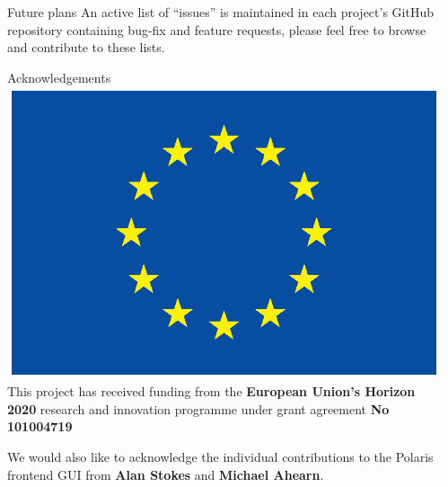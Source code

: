 \documentclass[final]{beamer}
\newlength{\sepwidth}
\newlength{\colwidth}
\newcommand{\separatorcolumn}{\begin{column}{\sepwidth}\end{column}}
\begin{document}
\begin{frame}[t]
\begin{columns}[t]
\begin{column}{\colwidth}
\begin{exampleblock}{Future plans}
                    An active list of ``issues'' is maintained in each project's GitHub repository containing
                    bug-fix and feature requests, please feel free to browse and contribute to these lists.

                \end{exampleblock}

                \begin{block}{Acknowledgements}
                    \includegraphics[height=\baselineskip]{logos/EU_flag_yellow_eps}
                    This project has received funding from the \textbf{European Union’s Horizon 2020} research and
                    innovation programme under grant agreement \textbf{No 101004719}

                    We would also like to acknowledge the individual contributions to the Polaris frontend
                    GUI from \textbf{Alan Stokes} and \textbf{Michael Ahearn}.
                \end{block}





            \end{column}
            \separatorcolumn
        \end{columns}

    \end{frame}
\end{document}
